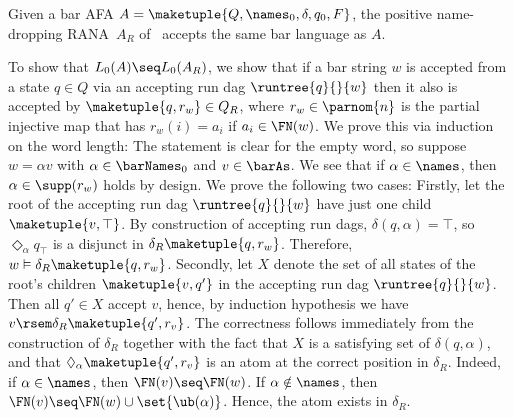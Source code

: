 \documentclass[10pt, final, conference, a4paper, twocolumn]{IEEEtran}
\begin{document}
\begin{theo}\label{thm:corrConstrB2R}
  Given a bar AFA $A = \maketuple{Q, \names_0, \delta, q_0, F}$, the positive name-dropping RANA~$A_{R}$ of~ accepts the same bar language as $A$.
\end{theo}
\begin{IEEEproof}
  To show that $L_0(A) \seq L_0(A_R)$, we show that if a bar string $w$ is accepted from a state
  $q \in Q$ via an accepting run dag $\runtree{q}{}{w}$ then it also is accepted by $\maketuple{q, r_w}
  \in Q_R$, where $r_w \in \parnom{n}$ is the partial injective map that has $r_w(i) = a_i$ if
  $a_i \in \FN(w)$. We prove this via induction on the word length:
  The statement is clear for the empty word, so suppose $w = \alpha v$ with $\alpha \in \barNames_0$
  and $v \in \barAs$. We see that if $\alpha \in \names$, then $\alpha \in \supp(r_w)$ holds by design.
  We prove the following two cases: Firstly, let the root of the accepting run dag
  $\runtree{q}{}{w}$ have just one child $\maketuple{v, \top}$. By construction of accepting run dags,
  $\delta(q, \alpha) = \top$, so $\Diamond_{\alpha} q_{\top}$ is a disjunct in $\delta_R\maketuple{q, r_w}$.
  Therefore, $w \vDash \delta_R\maketuple{q, r_w}$.
  Secondly, let $X$ denote the set of all states of the root's children $\maketuple{v, q'}$
  in the accepting run dag $\runtree{q}{}{w}$. Then all $q' \in X$ accept $v$, hence, by induction hypothesis
  we have $v \rsem \delta_R\maketuple{q',r_v}$. The correctness follows immediately from the
  construction of $\delta_R$ together with the fact that $X$ is a satisfying set of $\delta(q, \alpha)$,
  and that $\Diamond_\alpha\maketuple{q', r_v}$ is an atom at the correct position in $\delta_R$.
  Indeed, if $\alpha \in \names$, then $\FN(v) \seq \FN(w)$. If $\alpha \notin \names$, then $\FN(v)
  \seq \FN(w) \cup \set{\ub(\alpha)}$. Hence, the atom exists in $\delta_R$.


\end{IEEEproof}
\end{document}

